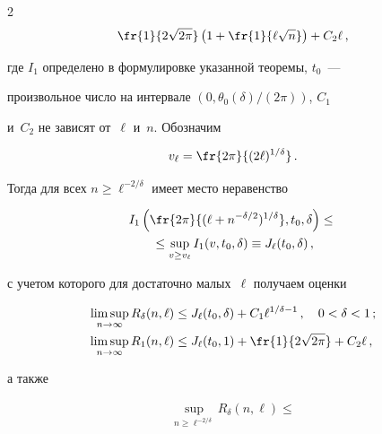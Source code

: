 \begin{multicols}{2}
\begin{multline*}
\fr{1}{2\sqrt{2\pi}}\left(1+\fr{1}{\ell\sqrt{n}}\right)+ C_2\ell\,,


\end{multline*}


где $I_1$ определено в формулировке указанной тео\-ре\-мы, $t_0$~---


произвольное число на интервале $(0,\theta_0(\delta)/(2\pi))$, $C_1$


и~$C_2$ не зависят от~$\ell$ и~$n$. Обозначим





\vspace*{-2pt}





\noindent


$$


v_\ell=\fr{2\pi}{(2\ell)^{1/\delta}}\,.


$$


Тогда для всех $n\ge\ell^{-2/\delta}$ имеет место неравенство


\begin{multline*}


I_1\left(\fr{2\pi}{(\ell+n^{-\delta/2})^{1/\delta}},t_0,\delta\right)\le{}\\


{}\le


\sup_{v\ge v_\ell}I_1(v,t_0,\delta)\equiv J_\ell(t_0,\delta)\,,


\end{multline*}


с учетом которого для достаточно малых~$\ell$ получаем оценки





\noindent


\begin{align*}


\limsup_{n\to\infty}R_\delta(n,\ell)&\le J_\ell(t_0,\delta)


+C_1\ell^{1/\delta-1}\,,\quad 0<\delta<1\,;\\


\limsup_{n\to\infty}R_1(n,\ell)&\le J_\ell(t_0,1)


+\fr{1}{2\sqrt{2\pi}}+ C_2\ell\,,


\end{align*}


а также


\begin{multline*}


\sup_{n\ge\ell^{-2/\delta}}R_\delta(n,\ell)\le



\end{multline*}
\end{multicols}
